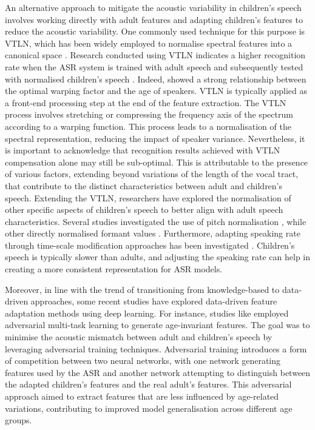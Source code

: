 An alternative approach to mitigate the acoustic variability in children's speech involves working directly with adult features and adapting children's features to reduce the acoustic variability. One commonly used technique for this purpose is \ac{VTLN}, which has been widely employed to normalise spectral features into a canonical space \cite{VTLN, VTLN2}. Research conducted using \ac{VTLN} indicates a higher recognition rate when the \ac{ASR} system is trained with adult speech and subsequently tested with normalised children's speech \cite{claus2013survey,potamianos1997automatic}. Indeed, \cite{potamianos1997combining} showed a strong relationship between the optimal warping factor and the age of speakers. \ac{VTLN} is typically applied as a front-end processing step at the end of the feature extraction. The \ac{VTLN} process involves stretching or compressing the frequency axis of the spectrum according to a warping function. This process leads to a normalisation of the spectral representation, reducing the impact of speaker variance. Nevertheless, it is important to acknowledge that recognition results achieved with \ac{VTLN} compensation alone may still be sub-optimal. This is attributable to the presence of various factors, extending beyond variations of the length of the vocal tract, that contribute to the distinct characteristics between adult and children's speech.
Extending the \ac{VTLN}, researchers have explored the normalisation of other specific aspects of children's speech to better align with adult speech characteristics. Several studies investigated the use of pitch normalisation \cite{f0norm,pitchnorm,pitch_adapt_norm, shahnawazuddin2023gammatone},  while other directly normalised formant values \cite{formant_norm,kumar2023effect}. Furthermore, adapting speaking rate through time-scale modification approaches has been investigated \cite{speaking_rate}. Children's speech is typically slower than adults, and adjusting the speaking rate can help in creating a more consistent representation for \ac{ASR} models.

Moreover, in line with the trend of transitioning from knowledge-based to data-driven approaches, some recent studies have explored data-driven feature adaptation methods using deep learning. For instance, studies like \cite{adversarial-adapt1,adversarial-adapt2} employed adversarial multi-task learning to generate age-invariant features. The goal was to minimise the acoustic mismatch between adult and children's speech by leveraging adversarial training techniques. Adversarial training introduces a form of competition between two neural networks, with one network generating features used by the \ac{ASR} and another network attempting to distinguish between the adapted children's features and the real adult's features. This adversarial approach aimed to extract features that are less influenced by age-related variations, contributing to improved model generalisation across different age groups.

